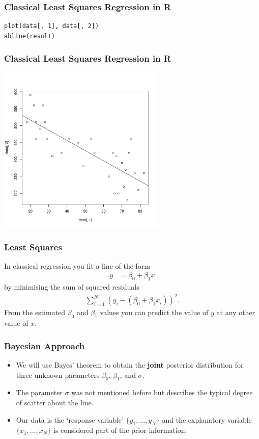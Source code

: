 \documentclass{beamer}
\begin{document}
\begin{frame}[fragile]
\frametitle{Classical Least Squares Regression in R}
\begin{verbatim}
plot(data[, 1], data[, 2])
abline(result)
\end{verbatim}

\end{frame}

\begin{frame}
\frametitle{Classical Least Squares Regression in R}
\centering
\includegraphics[width=0.6\textwidth]{images/road_lm.pdf}
\end{frame}


\begin{frame}
\frametitle{Least Squares}
In classical regression you fit a line of the form
\begin{align}
y &= \beta_0 + \beta_1 x
\end{align}
by minimising the sum of squared residuals
\begin{align}
\sum_{i=1}^N \left(y_i - (\beta_0 + \beta_1 x_i)\right)^2.
\end{align}
\pause
From the estimated $\beta_0$ and $\beta_1$ values
you can predict the value of $y$ at any other value of $x$.

\end{frame}


\begin{frame}
\frametitle{Bayesian Approach}

\begin{itemize}
\item We will use Bayes' theorem to obtain the {\bf joint}
posterior distribution for three unknown parameters
$\beta_0$, $\beta_1$, and $\sigma$.\pause
\item The parameter $\sigma$ was not mentioned before
but describes the typical degree of scatter about the line.\pause
\item Our data is the `response variable'
$\{y_1, ..., y_N\}$ and the explanatory variable
$\{x_1, ..., x_N\}$ is considered part of the prior information.
\end{itemize}

\end{frame}
\end{document}
